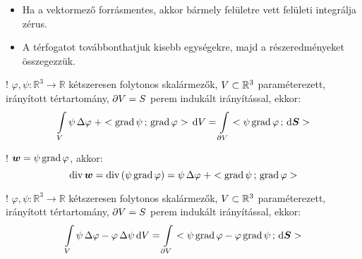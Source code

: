 \documentclass[main.tex]{subfiles}
\begin{document}
\begin{itemize}
  \item Ha a vektormező forrásmentes, akkor bármely
        felületre vett felületi integrálja zérus.

  \item A térfogatot továbbonthatjuk kisebb egységekre,
        majd a részeredményeket összegezzük.
\end{itemize}




! $\varphi, \psi : \mathbb{R}^3 \rightarrow \mathbb{R}$
kétszeresen folytonos skalármezők, ${V} \subset \mathbb{R}^3$
paraméterezett, irányított tértartomány,
$\partial {V} = {S}$
perem indukált irányítással, ekkor:
\begin{equation*}
  \int \limits_{{V}}
  \psi \, \Delta \varphi \; + < \operatorname{grad} \psi \, ; \, \operatorname{grad} \varphi >
  \, \mathrm{d} {V}
  =
  \int \limits_{\partial {V}}
  < \psi \operatorname{grad} \varphi \, ; \, \mathrm{d} \boldsymbol{S} >
\end{equation*}




! $\boldsymbol{w} = \psi \operatorname{grad} \varphi$, akkor:
\begin{equation*}
  \operatorname{div} \boldsymbol{w}
  =
  \operatorname{div} \left(
  \psi \operatorname{grad} \varphi
  \right)
  =
  \psi \, \Delta \varphi \; + < \operatorname{grad} \psi \, ; \, \operatorname{grad} \varphi >
\end{equation*}




! $\varphi, \psi : \mathbb{R}^3 \rightarrow \mathbb{R}$
kétszeresen folytonos skalármezők, ${V} \subset \mathbb{R}^3$
paraméterezett, irányított tértartomány,
$\partial {V} = {S}$
perem indukált irányítással, ekkor:
\begin{equation*}
  \int \limits_{{V}}
  \psi \, \Delta \varphi - \varphi \, \Delta \psi
  \, \mathrm{d} {V}
  =
  \int \limits_{\partial {V}}
  < 
    \psi \operatorname{grad} \varphi - \varphi \operatorname{grad} \psi
   \, ; \, \mathrm{d} \boldsymbol{S} >
\end{equation*}
\end{document}
